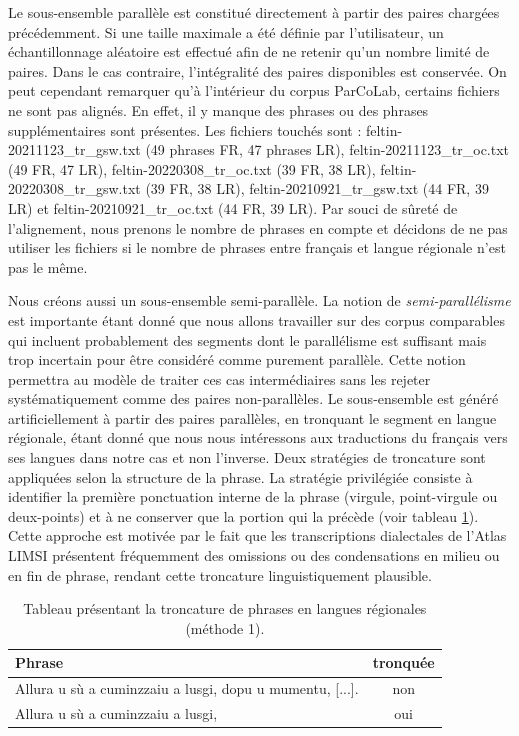 Le sous-ensemble parallèle est constitué directement à partir des paires chargées précédemment. Si une 
taille maximale a été définie par l'utilisateur, un échantillonnage aléatoire est effectué afin de ne 
retenir qu'un nombre limité de paires. Dans le cas contraire, l'intégralité des paires disponibles est 
conservée. On peut cependant remarquer qu'à l'intérieur du corpus ParCoLab, certains fichiers ne sont pas alignés.
En effet, il y manque des phrases ou des phrases supplémentaires sont présentes.
Les fichiers touchés sont : feltin-20211123\_tr\_gsw.txt (49 phrases FR, 47 phrases LR), feltin-20211123\_tr\_oc.txt (49 FR, 47 LR),
feltin-20220308\_tr\_oc.txt (39 FR, 38 LR), feltin-20220308\_tr\_gsw.txt (39 FR, 38 LR), feltin-20210921\_tr\_gsw.txt (44 FR, 39 LR) et
feltin-20210921\_tr\_oc.txt (44 FR, 39 LR). Par souci de sûreté de l'alignement, nous prenons le nombre de phrases en compte
et décidons de ne pas utiliser les fichiers si le nombre de phrases entre français et langue régionale n'est pas le
même.

Nous créons aussi un sous-ensemble semi-parallèle. La notion de \textit{semi-parallélisme} est importante étant donné
que nous allons travailler sur des corpus comparables qui incluent probablement des segments dont le parallélisme
est suffisant mais trop incertain pour être considéré comme purement parallèle.
Cette notion permettra au modèle de traiter ces cas intermédiaires sans les rejeter systématiquement
comme des paires non-parallèles.
Le sous-ensemble est généré artificiellement à partir des paires parallèles, en 
tronquant le segment en langue régionale, étant donné que nous nous intéressons aux traductions du français
vers ses langues dans notre cas et non l'inverse. Deux stratégies de troncature sont appliquées selon la structure 
de la phrase.
La stratégie privilégiée consiste à identifier la première ponctuation interne de la phrase 
(virgule, point-virgule ou deux-points) et à ne conserver que la portion qui la précède (voir tableau \ref{method1_truncate}). Cette approche est 
motivée par le fait que les transcriptions dialectales de l'Atlas LIMSI présentent fréquemment des omissions 
ou des condensations en milieu ou en fin de phrase, rendant cette troncature linguistiquement plausible.

\begin{table}[H]
\centering
\begin{tabular}{lc}
\hline
\textbf{Phrase} & \textbf{tronquée} \\
\hline
Allura u sù a cuminzzaiu a lusgi, dopu u mumentu, [...]. & non\\
Allura u sù a cuminzzaiu a lusgi, & oui\\
\hline
\end{tabular}
\caption{Tableau présentant la troncature de phrases en langues régionales (méthode 1).}
\label{method1_truncate}
\end{table}

